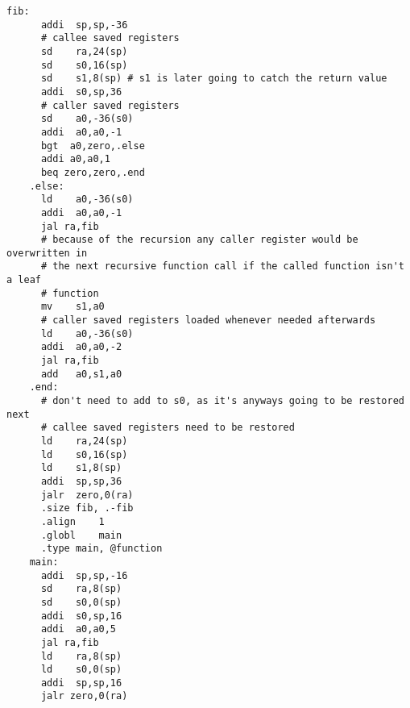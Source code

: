 \documentclass[varwidth]{standalone}
\begin{document}
  \begin{BVerbatim}[gobble=4]
    fib:
      addi	sp,sp,-36
      # callee saved registers
      sd	ra,24(sp)
      sd	s0,16(sp)
      sd	s1,8(sp) # s1 is later going to catch the return value
      addi	s0,sp,36
      # caller saved registers
      sd	a0,-36(s0)
      addi  a0,a0,-1
      bgt  a0,zero,.else
      addi a0,a0,1
      beq zero,zero,.end
    .else:
      ld	a0,-36(s0)
      addi	a0,a0,-1
      jal ra,fib
      # because of the recursion any caller register would be overwritten in
      # the next recursive function call if the called function isn't a leaf
      # function
      mv	s1,a0
      # caller saved registers loaded whenever needed afterwards
      ld	a0,-36(s0)
      addi	a0,a0,-2
      jal ra,fib
      add	a0,s1,a0
    .end:
      # don't need to add to s0, as it's anyways going to be restored next
      # callee saved registers need to be restored
      ld	ra,24(sp)
      ld	s0,16(sp)
      ld	s1,8(sp)
      addi	sp,sp,36
      jalr	zero,0(ra)
      .size	fib, .-fib
      .align	1
      .globl	main
      .type	main, @function
    main:
      addi	sp,sp,-16
      sd	ra,8(sp)
      sd	s0,0(sp)
      addi	s0,sp,16
      addi  a0,a0,5
      jal ra,fib
      ld	ra,8(sp)
      ld	s0,0(sp)
      addi	sp,sp,16
      jalr zero,0(ra)
  \end{BVerbatim}
\end{document}
